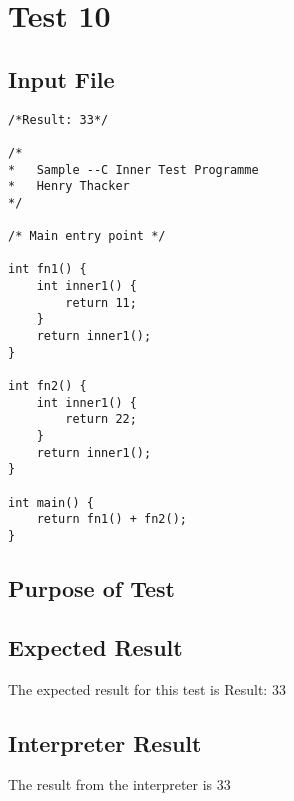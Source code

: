 \section{Test 10}
\subsection{Input File}
\begin{verbatim}
/*Result: 33*/

/*
*	Sample --C Inner Test Programme
*	Henry Thacker
*/

/* Main entry point */

int fn1() {
	int inner1() {
		return 11;
	}
	return inner1();
}

int fn2() {
	int inner1() {
		return 22;
	}
	return inner1();
}

int main() {
	return fn1() + fn2();
}\end{verbatim}\subsection{Purpose of Test}

\subsection{Expected Result}
The expected result for this test is Result: 33
\subsection{Interpreter Result}
The result from the interpreter is 33
